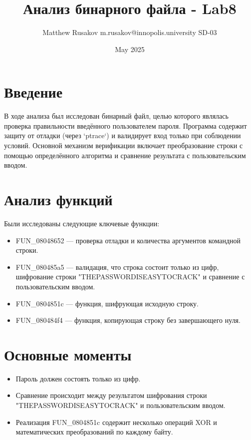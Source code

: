 \usepackage[utf8]{inputenc}
\usepackage{listings}
\usepackage{color}
\usepackage{geometry}
\usepackage[T1]{fontenc}
\usepackage[russian]{babel}
\usepackage{graphicx}

\title{Анализ бинарного файла - Lab8}
\author{Matthew Rusakov m.rusakov@innopolis.university SD-03}
\date{May 2025}





    \maketitle


    \section{Введение}
    В ходе анализа был исследован бинарный файл, целью которого являлась проверка правильности введённого пользователем пароля. Программа содержит защиту от отладки (через `ptrace`) и валидирует вход только при соблюдении условий. Основной механизм верификации включает преобразование строки с помощью определённого алгоритма и сравнение результата с пользовательским вводом.


    \section{Анализ функций}

    Были исследованы следующие ключевые функции:

    \begin{itemize}
        \item FUN\_08048652 — проверка отладки и количества аргументов командной строки.
        \item FUN\_080485a5 — валидация, что строка состоит только из цифр, шифрование строки "THEPASSWORDISEASYTOCRACK" и сравнение с пользовательским вводом.
        \item FUN\_0804851c — функция, шифрующая исходную строку.
        \item FUN\_080484f4 — функция, копирующая строку без завершающего нуля.
    \end{itemize}


    \section{Основные моменты}

    \begin{itemize}
        \item Пароль должен состоять только из цифр.
        \item Сравнение происходит между результатом шифрования строки "THEPASSWORDISEASYTOCRACK" и пользовательским вводом.
        \item Реализация FUN\_0804851c содержит несколько операций XOR и математических преобразований по каждому байту.
    \end{itemize}


